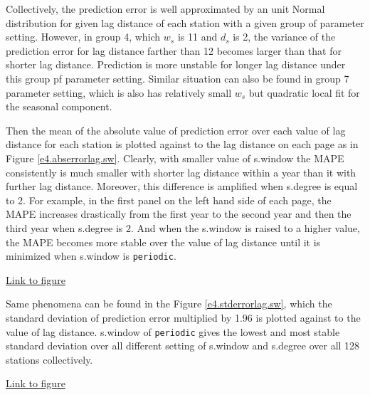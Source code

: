 Collectively, the prediction error is well approximated by an unit Normal
distribution for given lag distance of each station with a given group of
parameter setting. However, in group 4, which $w_s$ is 11 and $d_s$ is 2, the 
variance of the prediction error for lag distance farther than 12 becomes larger
than that for shorter lag distance. Prediction is more unstable for longer lag
distance under this group pf parameter setting. Similar situation can also be
found in group 7 parameter setting, which is also has relatively small $w_s$ but
quadratic local fit for the seasonal component.

Then the mean of the absolute value of prediction error over each value of lag
distance for each station is plotted against to the lag distance on each page as
in Figure \href{../plots/a1950/E4/tmax.absmeans.vs.lag.sw.pdf}
{\ref*{e4.abserrorlag.sw}}. Clearly, with smaller value of s.window the MAPE 
consistently is much smaller with shorter lag distance within a year than it with
further lag distance. Moreover, this difference is amplified when s.degree is 
equal to 2. For example, 
in the first panel on the left hand side of each page, the MAPE increases 
drastically from the first year to the second year and then the third year when
s.degree is 2. And when the s.window is raised to a higher value, the MAPE 
becomes more stable over the value of lag distance until it is minimized when 
s.window is \texttt{periodic}.

\begin{framed}
\begin{center}
  \href{../plots/a1950/E4/tmax.absmeans.vs.lag.sw.pdf}{Link to figure}
  \label{e4.abserrorlag.sw}
\end{center}
\end{framed}

Same phenomena can be found in the Figure 
\href{../plots/a1950/E4/tmax.std.vs.lag.sw.pdf}{\ref*{e4.stderrorlag.sw}}, which 
the standard deviation of prediction error multiplied by 1.96 is plotted against
to the value of lag distance. s.window of \texttt{periodic} gives the 
lowest and most stable standard deviation over all different setting of s.window
and s.degree over all 128 stations collectively. 

\begin{framed}
\begin{center}
  \href{../plots/a1950/E4/tmax.std.vs.lag.sw.pdf}{Link to figure}
  \label{e4.stderrorlag.sw}
\end{center}
\end{framed}

